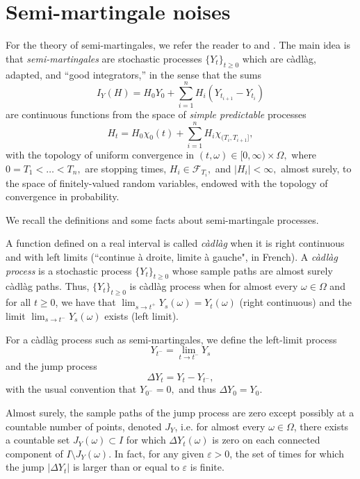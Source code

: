 \documentclass[reqno,12pt]{amsart}
\theoremstyle{plain} %
\theoremstyle{definition} %
\begin{document}
\section{Semi-martingale noises}
\label{secsemimartingale}

For the theory of semi-martingales, we refer the reader to \cite{Protter2005} and \cite{Metivier1982}. The main idea is that \emph{semi-martingales} are stochastic processes $\{Y_t\}_{t\geq 0}$ which are c\`adl\`ag, adapted, and ``good integrators,'' in the sense that the sums
\[
    I_Y(H) = H_0 Y_0 + \sum_{i=1}^n H_i(Y_{t_{i+1}}-Y_{t_i})
\]
are continuous functions from the space of \emph{simple predictable} processes
\[
    H_t = H_0 \chi_{0}(t) + \sum_{i=1}^n H_i \chi_{(T_i, T_{i+1}]},
\]
with the topology of uniform convergence in $(t, \omega)\in [0,\infty)\times \Omega,$ where $0=T_1 < \ldots < T_n,$ are stopping times, $H_i \in \mathcal{F}_{T_i},$ and $|H_i| < \infty,$ almost surely, to the space of finitely-valued random variables, endowed with the topology of convergence in probability.

We recall the definitions and some facts about semi-martingale processes.

A function defined on a real interval is called \emph{c\`adl\`ag} when it is right continuous and with left limits (``continue \`a droite, limite \`a gauche", in French). A \emph{c\`adl\`ag process} is a stochastic process $\{Y_t\}_{t\geq 0}$ whose sample paths are almost surely c\`adl\`ag paths. Thus, $\{Y_t\}_{t\geq 0}$ is c\`adl\`ag process when for almost every $\omega\in \Omega$ and for all $t\geq 0$, we have that $\lim_{s\rightarrow t^+} Y_s(\omega) = Y_t(\omega)$ (right continuous) and the limit $\lim_{s \rightarrow t^-} Y_s(\omega)$ exists (left limit).

For a c\`adl\`ag process such as semi-martingales, we define the left-limit process
\begin{equation}
  Y_{t^{-}} = \lim_{t \rightarrow t^-} Y_s
\end{equation}
and the jump process
\begin{equation}
  \Delta Y_t = Y_t - Y_{t^{-}},
\end{equation}
with the usual convention that $Y_{0^-} = 0,$ and thus $\Delta Y_0 = Y_0.$

Almost surely, the sample paths of the jump process are zero except possibly at a countable number of points, denoted $J_{Y}$, i.e. for almost every $\omega\in \Omega$, there exists a countable set $J_{Y}(\omega) \subset I$ for which $\Delta Y_t(\omega)$ is zero on each connected component of $I\setminus J_{Y}(\omega)$. In fact, for any given $\varepsilon > 0$, the set of times for which the jump $|\Delta Y_t|$ is larger than or equal to $\varepsilon$ is finite.
\end{document}
